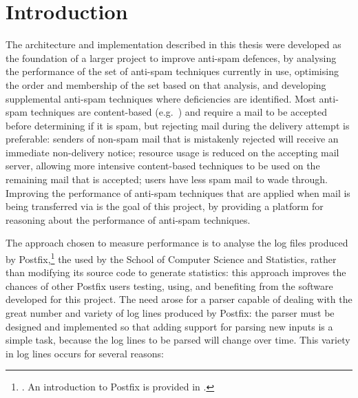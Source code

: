 \chapter{Introduction}

\label{introduction}

The architecture and implementation described in this thesis were developed
as the foundation of a larger project to improve anti-spam defences, by
analysing the performance of the set of anti-spam techniques currently in
use, optimising the order and membership of the set based on that analysis,
and developing supplemental anti-spam techniques where deficiencies are
identified.  Most anti-spam techniques are content-based
(e.g.~\cite{a-plan-for-spam, relaxed-online-svms, word-stemming}) and
require a mail to be accepted before determining if it is spam, but
rejecting mail during the delivery attempt is preferable: senders of
non-spam mail that is mistakenly rejected will receive an immediate
non-delivery notice; resource usage is reduced on the accepting mail
server, allowing more intensive content-based techniques to be used on the
remaining mail that is accepted; users have less spam mail to wade through.
Improving the performance of anti-spam techniques that are applied when
mail is being transferred via  is the goal of this project,
by providing a platform for reasoning about the performance of anti-spam
techniques.

The approach chosen to measure performance is to analyse the log files
produced by
Postfix,\footnote{.  An
introduction to Postfix is provided in .} the
 used by the School of Computer Science and Statistics, rather
than modifying its source code to generate statistics: this approach
improves the chances of other Postfix users testing, using, and benefiting
from the software developed for this project.  The need arose for a parser
capable of dealing with the great number and variety of log lines produced
by Postfix: the parser must be designed and implemented so that adding
support for parsing new inputs is a simple task, because the log lines to
be parsed will change over time.  This variety in log lines occurs for
several reasons:

